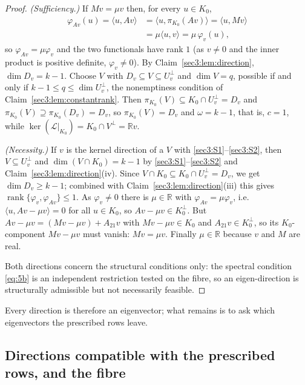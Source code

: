 \documentclass[journal]{IEEEtran}
\theoremstyle{plainn}
\theoremstyle{remark}
\newcommand{\rank}{\operatorname{rank}}
\begin{document}
\begin{proof}
\emph{(Sufficiency.)} If $Mv=\mu v$ then, for every $u\in K_0$,
\begin{align*}
\varphi_{Av}(u)=\langle u,Av\rangle
&=\langle u,\pi_{K_0}(Av)\rangle=\langle u,Mv\rangle\\
&=\mu\langle u,v\rangle=\mu\,\varphi_v(u),
\end{align*}
so $\varphi_{Av}=\mu\varphi_v$ and the two functionals have rank $1$ (as $v\neq0$ and the inner product
is positive definite, $\varphi_v\neq0$). By Claim~\ref{sec3:lem:direction}, $\dim D_v=k-1$. Choose $V$
with $D_v\subseteq V\subseteq U_v^\perp$ and $\dim V=q$, possible if and only if
$k-1\le q\le\dim U_v^\perp$, the nonemptiness condition of Claim~\ref{sec3:lem:constantrank}. Then
$\pi_{K_0}(V)\subseteq K_0\cap U_v^\perp=D_v$ and $\pi_{K_0}(V)\supseteq\pi_{K_0}(D_v)=D_v$, so
$\pi_{K_0}(V)=D_v$ and $\omega=k-1$, that is, $c=1$, while
$\ker(\mathcal{L}|_{K_0})=K_0\cap V^\perp=\mathbb{R} v$.

\emph{(Necessity.)} If $v$ is the kernel direction of a $V$ with \ref{sec3:S1}--\ref{sec3:S2}, then
$V\subseteq U_v^\perp$ and $\dim(V\cap K_0)=k-1$ by
\ref{sec3:S1}--\ref{sec3:S2} and Claim~\ref{sec3:lem:direction}(iv). Since
$V\cap K_0\subseteq K_0\cap U_v^\perp=D_v$, we get
$\dim D_v\ge k-1$; combined with Claim~\ref{sec3:lem:direction}(iii) this gives
$\rank\{\varphi_v,\varphi_{Av}\}\le1$. As
$\varphi_v\neq0$ there is $\mu\in\mathbb{R}$ with $\varphi_{Av}=\mu\varphi_v$, i.e.\
$\langle u,Av-\mu v\rangle=0$ for all $u\in K_0$, so $Av-\mu v\in K_0^\perp$. But
$Av-\mu v=(Mv-\mu v)+A_{21}v$ with $Mv-\mu v\in K_0$ and $A_{21}v\in K_0^\perp$, so its
$K_0$-component $Mv-\mu v$ must vanish: $Mv=\mu v$. Finally $\mu\in\mathbb{R}$ because $v$ and $M$ are
real.

Both directions concern the structural conditions only: the spectral condition \eqref{eq:5b} is an
independent restriction tested on the fibre, so an eigen-direction is structurally admissible but not
necessarily feasible.
\end{proof}


Every direction is therefore an eigenvector; what remains is to ask which eigenvectors the prescribed
rows leave.


\subsection{Directions compatible with the prescribed rows, and the fibre}\label{sec3:sub:prescribed}
\end{document}
